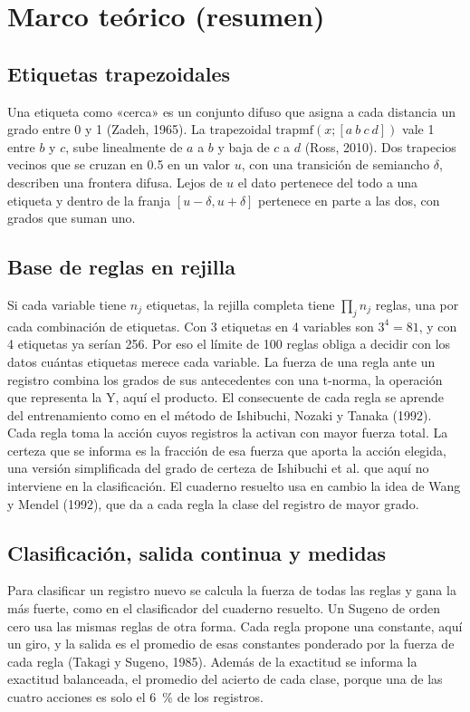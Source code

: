 \documentclass[11pt,letterpaper]{article}
\begin{document}
\section{Marco teórico (resumen)}

\subsection{Etiquetas trapezoidales}

Una etiqueta como «cerca» es un conjunto difuso que asigna a cada distancia un grado entre 0 y 1 (Zadeh, 1965). La trapezoidal $\mathrm{trapmf}(x;[a\ b\ c\ d])$ vale 1 entre $b$ y $c$, sube linealmente de $a$ a $b$ y baja de $c$ a $d$ (Ross, 2010). Dos trapecios vecinos que se cruzan en 0.5 en un valor $u$, con una transición de semiancho $\delta$, describen una frontera difusa. Lejos de $u$ el dato pertenece del todo a una etiqueta y dentro de la franja $[u-\delta, u+\delta]$ pertenece en parte a las dos, con grados que suman uno.

\subsection{Base de reglas en rejilla}

Si cada variable tiene $n_j$ etiquetas, la rejilla completa tiene $\prod_j n_j$ reglas, una por cada combinación de etiquetas. Con 3 etiquetas en 4 variables son $3^4=81$, y con 4 etiquetas ya serían 256. Por eso el límite de 100 reglas obliga a decidir con los datos cuántas etiquetas merece cada variable. La fuerza de una regla ante un registro combina los grados de sus antecedentes con una t-norma, la operación que representa la Y, aquí el producto. El consecuente de cada regla se aprende del entrenamiento como en el método de Ishibuchi, Nozaki y Tanaka (1992). Cada regla toma la acción cuyos registros la activan con mayor fuerza total. La certeza que se informa es la fracción de esa fuerza que aporta la acción elegida, una versión simplificada del grado de certeza de Ishibuchi et al. que aquí no interviene en la clasificación. El cuaderno resuelto usa en cambio la idea de Wang y Mendel (1992), que da a cada regla la clase del registro de mayor grado.

\subsection{Clasificación, salida continua y medidas}

Para clasificar un registro nuevo se calcula la fuerza de todas las reglas y gana la más fuerte, como en el clasificador del cuaderno resuelto. Un Sugeno de orden cero usa las mismas reglas de otra forma. Cada regla propone una constante, aquí un giro, y la salida es el promedio de esas constantes ponderado por la fuerza de cada regla (Takagi y Sugeno, 1985). Además de la exactitud se informa la exactitud balanceada, el promedio del acierto de cada clase, porque una de las cuatro acciones es solo el 6~\% de los registros.
\end{document}

